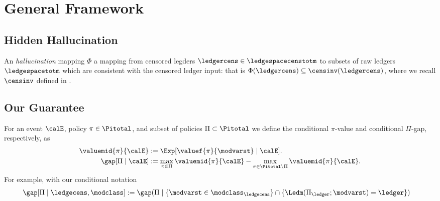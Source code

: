 
\section{General Framework}

\subsection{Hidden Hallucination}




\begin{definition} An \emph{hallucination} mapping $\Phi$ a mapping from censored legders $\ledgercens \in \ledgespacecenstotm $ to subsets of raw ledgers $\ledgespacetotm$ which are consistent with the censored ledger input: that is $\Phi(\ledgercens) \subseteq \censinv(\ledgercens)$, where we recall $\censinv$ defined in .
\end{definition}

\subsection{Our Guarantee}

For an event $\calE$, policy $\pi \in \Pitotal$, and subset of policies $\Pi \subset \Pitotal$ we define the conditional $\pi$-value and conditional $\Pi$-gap, respectively, as
\begin{align}
\valuemid{\pi}{\calE} &:= \Exp[\valuef{\pi}{\modvarst} \mid \calE].\\
\gap[\Pi \mid \calE] &:= \max_{\pi \in \Pi} \valuemid{\pi}{\calE} -  \max_{\pi \in \Pitotal \setminus \Pi} \valuemid{\pi}{\calE}. 
\end{align}
For example, with our conditional notation
\begin{align}
    \gap[ \Pi \mid  \ledgecens , \modclass] &:= \gap(\Pi  \mid \{\modvarst \in \modclass_{\ledgecens}\} \cap \{\Ledm(\Pi_{\ledger};\modvarst)  = \ledger\} )
\end{align}

